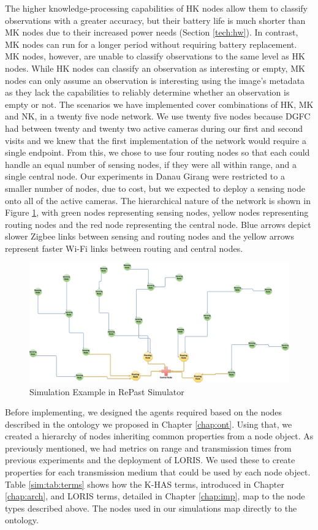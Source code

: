 The higher knowledge-processing capabilities of HK nodes allow them to classify observations with a greater accuracy, but their battery life is much shorter than MK nodes due to their increased power needs (Section \ref{tech:hw}). In contrast, MK nodes can run for a longer period without requiring battery replacement. MK nodes, however, are unable to classify observations to the same level as HK nodes. While HK nodes can classify an observation as interesting or empty, MK nodes can only assume an observation is interesting using the image's metadata as they lack the capabilities to reliably determine whether an observation is empty or not. The scenarios we have implemented cover combinations of HK, MK and NK, in a twenty five node network. We use twenty five nodes because DGFC had between twenty and twenty two active cameras during our first and second visits and we knew that the first implementation of the network would require a single endpoint. From this, we chose to use four routing nodes so that each could handle an equal number of sensing nodes, if they were all within range, and a single central node. Our experiments in Danau Girang were restricted to a smaller number of nodes, due to cost, but we expected to deploy a sensing node onto all of the active cameras. The hierarchical nature of the network is shown in Figure \ref{fig:sim}, with green nodes representing sensing nodes, yellow nodes representing routing nodes and the red node representing the central node. Blue arrows depict slower Zigbee links between sensing and routing nodes and the yellow arrows represent faster Wi-Fi links between routing and central nodes.

	\begin{figure}[h]
	\centering
	\includegraphics[width=\textwidth]{Chap7/figures/KHASARCH}
	\caption{Simulation Example in RePast Simulator}
	\label{fig:sim}
	\end{figure}

Before implementing, we designed the agents required based on the nodes described in the ontology we proposed in Chapter \ref{chap:ont}. Using that, we created a hierarchy of nodes inheriting common properties from a node object. As previously mentioned, we had metrics on range and transmission times from previous experiments and the deployment of LORIS. We used these to create properties for each transmission medium that could be used by each node object. Table \ref{sim:tab:terms} shows how the K-HAS terms, introduced in Chapter \ref{chap:arch}, and LORIS terms, detailed in Chapter \ref{chap:imp}, map to the node types described above. The nodes used in our simulations map directly to the ontology.

